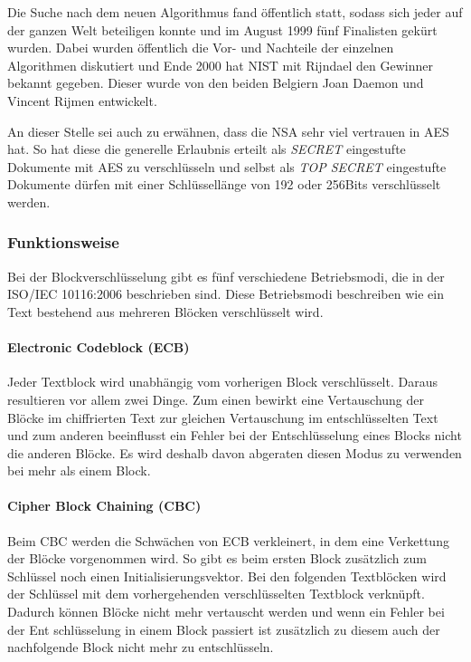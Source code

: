 Die Suche nach dem neuen Algorithmus fand öffentlich statt, sodass sich jeder auf der ganzen
Welt beteiligen konnte und im August 1999 fünf Finalisten gekürt wurden. Dabei wurden
öffentlich die Vor- und Nachteile der einzelnen Algorithmen diskutiert und Ende 2000 hat NIST
mit Rijndael den Gewinner bekannt gegeben. Dieser wurde von den beiden Belgiern Joan
Daemon und Vincent Rijmen entwickelt.

An dieser Stelle sei auch zu erwähnen, dass die \ac{NSA} sehr viel vertrauen in AES hat. So hat
diese die generelle Erlaubnis erteilt als \emph{SECRET} eingestufte Dokumente mit AES zu
verschlüsseln und selbst als \emph{TOP SECRET} eingestufte Dokumente dürfen mit einer
Schlüssellänge von 192 oder 256Bits verschlüsselt werden. \cite{paar10}
 
 \subsubsection{Funktionsweise}
 \label{aes-funktion}
 Bei der Blockverschlüsselung gibt es fünf verschiedene Betriebsmodi, die in der ISO/IEC 10116:2006
 \cite{ISO10116} beschrieben sind. Diese Betriebsmodi beschreiben wie ein Text bestehend aus
 mehreren Blöcken verschlüsselt wird.
 
  \paragraph{Electronic Codeblock (ECB)}
   Jeder Textblock wird unabhängig vom vorherigen Block verschlüsselt. Daraus resultieren vor allem
   zwei Dinge. Zum einen bewirkt eine Vertauschung der Blöcke im chiffrierten Text zur gleichen Vertauschung
   im entschlüsselten Text und zum anderen beeinflusst ein Fehler bei der Entschlüsselung eines Blocks
   nicht die anderen Blöcke. Es wird deshalb davon abgeraten diesen Modus zu verwenden bei mehr
   als einem Block.

  \paragraph{Cipher Block Chaining (CBC)}
   Beim CBC werden die Schwächen von ECB verkleinert, in dem eine Verkettung der Blöcke vorgenommen
   wird. So gibt es beim ersten Block zusätzlich zum Schlüssel noch einen Initialisierungsvektor. Bei den
   folgenden Textblöcken wird der Schlüssel mit dem vorhergehenden verschlüsselten Textblock
   verknüpft. Dadurch können Blöcke nicht mehr vertauscht werden und wenn ein Fehler bei der Ent\-
   schlüsselung in einem Block passiert ist zusätzlich zu diesem auch der nachfolgende Block nicht mehr
   zu entschlüsseln.
   
